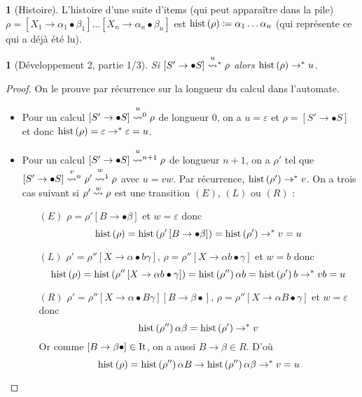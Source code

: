 \documentclass[11pt,a4paper]{article}
\theoremstyle{plain}
\theoremstyle{definition}
\newtheorem{defn}[thm]{\protect\definitionname}
\theoremstyle{definition}
\theoremstyle{remark}
\theoremstyle{remark}
\theoremstyle{plain}
\newtheorem{lem}[thm]{\protect\lemmaname}
\theoremstyle{plain}
\theoremstyle{plain}
\theoremstyle{remark}
\providecommand{\definitionname}{Définition}
\providecommand{\lemmaname}{Lemme}
\begin{document}
\begin{defn}[Histoire]
	
	L'histoire d'une suite d'items (qui peut apparaître dans la pile)
	$\rho=\left[X_{1}\to\alpha_{1}\bullet\beta_{1}\right]\dots\left[X_{n}\to\alpha_{n}\bullet\beta_{n}\right]$
	est $\operatorname{hist}\left(\rho\right)\coloneqq\alpha_{1}\dots\alpha_{n}$ (qui représente
	ce qui a déjà été lu).\end{defn}
\begin{lem}[Développement 2, partie 1/3]
	Si $\left[S'\to\bullet S\right]\transitionn u*\rho$ alors $\operatorname{hist}\left(\rho\right)\to^{*}u$.\label{lem:hist}\end{lem}
\begin{proof}
	On le prouve par récurrence sur la longueur du calcul dans l'automate.
	\begin{itemize}
		\item Pour un calcul $\left[S'\to\bullet S\right]\transitionn u0\rho$ de
		longueur $0$, on a $u=\varepsilon$ et $\rho=\left[S'\to\bullet S\right]$
		et donc $\operatorname{hist}\left(\rho\right)=\varepsilon\to^{*}\varepsilon=u$.
		\item Pour un calcul $\left[S'\to\bullet S\right]\transitionn u{n+1}\rho$
		de longueur $n+1$, on a $\rho'$ tel que $\left[S'\to\bullet S\right]\transitionn vn\rho'\transitionn w1\rho$
		avec $u=vw$. Par récurrence, $\operatorname{hist}\left(\rho'\right)\to^{*}v$. On a trois
		cas suivant si $\rho'\overset{w}{\leadsto}\rho$ est une transition $(E)$,
		$(L)$ ou $(R)$ :
		
		\begin{itemize}
			\item[$(E)$]  $\rho=\rho'\left[B\to\bullet\beta\right]$ et $w=\varepsilon$ donc
			\[
			\operatorname{hist}\left(\rho\right)=\operatorname{hist}\left(\rho'\left[B\to\bullet\beta\right]\right)=\operatorname{hist}\left(\rho'\right)\to^{*}v=u
			\]
			
			\item[$(L)$]  $\rho'=\rho''\left[X\to\alpha\bullet b\gamma\right]$, $\rho=\rho''\left[X\to\alpha b\bullet\gamma\right]$
			et $w=b$ donc
			\[
			\operatorname{hist}\left(\rho\right)=\operatorname{hist}\left(\rho''\left[X\to\alpha b\bullet\gamma\right]\right)=\operatorname{hist}\left(\rho''\right)\alpha b=\operatorname{hist}\left(\rho'\right)b\to^{*}vb=u
			\]
			
			\item[$(R)$]  $\rho'=\rho''\left[X\to\alpha\bullet B\gamma\right]\left[B\to\beta\bullet\right]$,
			$\rho=\rho''\left[X\to\alpha B\bullet\gamma\right]$ et $w=\varepsilon$
			donc
			\[
			\operatorname{hist}\left(\rho''\right)\alpha\beta=\operatorname{hist}\left(\rho'\right)\to^{*}v
			\]
			Or comme $\left[B\to\beta\bullet\right]\in\operatorname{It}$, on a aussi $B\to\beta\in R$.
			D'où
			\[
			\operatorname{hist}\left(\rho\right)=\operatorname{hist}\left(\rho''\right)\alpha B\to\operatorname{hist}\left(\rho''\right)\alpha\beta\to^{*}v=u
			\]
			
		\end{itemize}
	\end{itemize}
\end{proof}
\end{document}
